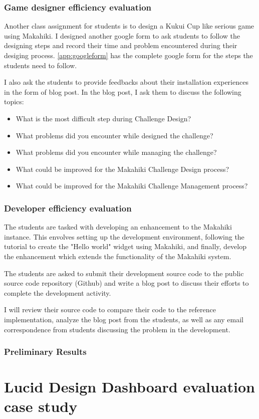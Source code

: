 \subsubsection{Game designer efficiency evaluation}
Another class assignment for students is to design a Kukui Cup like serious game using Makahiki. I designed another google form to ask students to follow the designing steps and record their time and problem encountered during their desiging process. \autoref{app:googleform} has the complete google form for the steps the students need to follow.

I also ask the students to provide feedbacks about their installation experiences in the form of blog post. In the blog post, I ask them to discuss the following topics:
\begin{itemize}
\item What is the most difficult step during Challenge Design?
\item What problems did you encounter while designed the challenge?
\item What problems did you encounter while managing the challenge?
\item What could be improved for the Makahiki Challenge Design process?
\item What could be improved for the Makahiki Challenge Management process?
\end{itemize}

\subsubsection{Developer efficiency evaluation}

The students are tasked with developing an enhancement to the Makahiki instance. This envolves setting up the development environment, following the tutorial to create the "Hello world" widget using Makahiki, and finally, develop the enhancement which extends the functionality of the Makahiki system.

The students are asked to submit their development source code to the public source code repository (Github) and write a blog post to discuss their efforts to complete the development activity.

I will review their source code to compare their code to the reference implementation, analyze the blog post from the students, as well as any email correspondence from students discussing the problem in the development.

\subsubsection{Preliminary Results}

\section{Lucid Design Dashboard evaluation case study}
